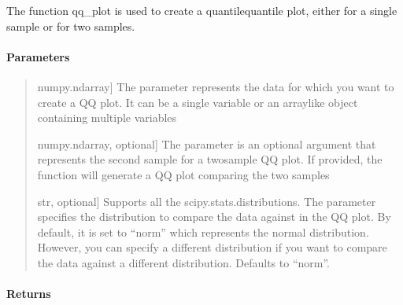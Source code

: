 \documentclass[letterpaper,10pt,english,openany,oneside]{sphinxmanual}
\begin{document}
\begin{fulllineitems}
\label{\detokenize{api_reference/generated/QuadratiK.tools.qq_plot:QuadratiK.tools.qq_plot}}
\pysigstartsignatures
{}
\pysigstopsignatures
\sphinxAtStartPar
The function qq\_plot is used to create a quantile\sphinxhyphen{}quantile plot, 
either for a single sample or for two samples.


\paragraph{Parameters}
\label{\detokenize{api_reference/generated/QuadratiK.tools.qq_plot:parameters}}\begin{quote}
\begin{description}
\sphinxlineitem{x}{[}numpy.ndarray{]}
\sphinxAtStartPar
The  parameter represents the data for which you want to 
create a QQ plot. It can be a single variable or an array\sphinxhyphen{}like 
object containing multiple variables

\sphinxlineitem{y}{[}numpy.ndarray, optional{]}
\sphinxAtStartPar
The parameter  is an optional argument that represents the second 
sample for a two\sphinxhyphen{}sample QQ plot. If provided, the function will generate 
a QQ plot comparing the two samples

\sphinxlineitem{dist}{[}str, optional{]}
\sphinxAtStartPar
Supports all the scipy.stats.distributions. The  parameter specifies
the distribution to compare the data against in the QQ plot. By default, 
it is set to “norm” which represents the normal distribution. However, you can 
specify a different distribution if you want to compare the data against
a different distribution. Defaults to “norm”.

\end{description}
\end{quote}


\paragraph{Returns}
\label{\detokenize{api_reference/generated/QuadratiK.tools.qq_plot:returns}}\begin{quote}


\end{quote}
\end{fulllineitems}
\end{document}
